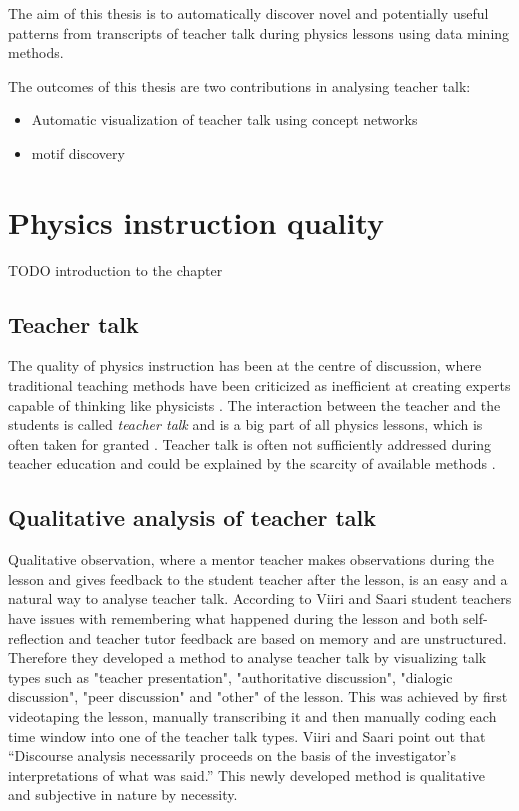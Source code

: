 \documentclass[utf8,english]{gradu3}
\begin{document}
The aim of this thesis is to automatically discover novel and potentially useful patterns from transcripts of teacher talk during physics lessons using data mining methods. 

The outcomes of this thesis are two contributions in analysing teacher talk:

\begin{itemize}
  \item Automatic visualization of teacher talk using concept networks
  \item  motif discovery
\end{itemize}



\chapter{Physics instruction quality}
\label{chap:quip}

TODO introduction to the chapter

\section{Teacher talk}
The quality of physics instruction has been at the centre of discussion, where traditional teaching methods have been criticized as inefficient at creating experts capable of thinking like physicists \parencite{wiemanTransformingPhysicsEducation2007}. The interaction between the teacher and the students is called \emph{teacher talk} and is a big part of all physics lessons, which is often taken for granted \parencite{scottTeachingScienceMeaningful2007}. Teacher talk is often not sufficiently addressed during teacher education and could be explained by the scarcity of available methods \parencite{lehesvuoriDialogicTeachingScience2013,viiriTeacherTalkPatterns2006, crespoPraisingCorrectingProspective2002}.

\section{Qualitative analysis of teacher talk}
Qualitative observation, where a mentor teacher makes observations during the lesson and gives feedback to the student teacher after the lesson, is an easy and a natural way to analyse teacher talk. According to Viiri and Saari \parencite*{viiriTeacherTalkPatterns2006} student teachers have issues with remembering what happened during the lesson and both self-reflection and teacher tutor feedback are based on memory and are unstructured. Therefore they developed a method to analyse teacher talk by visualizing talk types such as "teacher presentation", "authoritative discussion", "dialogic discussion", "peer discussion" and "other" of the lesson. This was achieved by first videotaping the lesson, manually transcribing it and then manually coding each time window into one of the teacher talk types. Viiri and Saari \parencite*{viiriTeacherTalkPatterns2006} point out that \enquote{Discourse analysis necessarily proceeds on the basis of the investigator’s interpretations of what was said.} This newly developed method is qualitative and subjective in nature by necessity.
\end{document}
